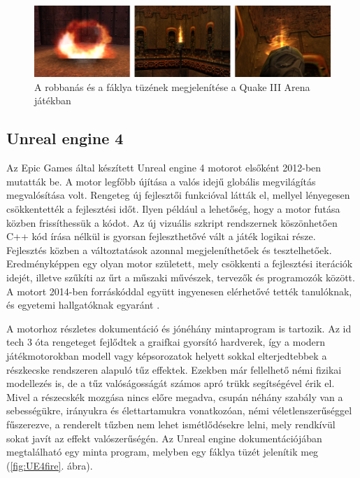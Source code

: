 
\begin{figure}[h]
\centering
\includegraphics[width=\textwidth]{kepek/quake3fire.png}
\caption{A robbanás és a fáklya tüzének megjelenítése a Quake III Arena játékban}
\label{fig:quake3fire}
\end{figure}



\subsection{Unreal engine 4}

Az Epic Games által készített Unreal engine 4 motorot elsőként 2012-ben mutatták be. A motor legfőbb újítása a valós idejű globális megvilágítás megvalósítása volt. Rengeteg új fejlesztői funkcióval látták el, mellyel lényegesen csökkentették a fejlesztési időt. Ilyen például a lehetőség, hogy a motor futása közben frissíthessük a kódot. Az új vizuális szkript rendszernek köszönhetően C++ kód írása nélkül is gyorsan fejleszthetővé vált a játék logikai része. Fejlesztés közben a változtatások azonnal megjeleníthetőek és tesztelhetőek. Eredményképpen egy olyan motor született, mely csökkenti a fejlesztési iterációk idejét, illetve szűkíti az űrt a műszaki művészek, tervezők és programozók között. A motort 2014-ben forráskóddal együtt ingyenesen elérhetővé tették tanulóknak, és egyetemi hallgatóknak egyaránt \cite{wikUE4}.

A motorhoz részletes dokumentáció és jónéhány mintaprogram is tartozik. Az id tech 3 óta rengeteget fejlődtek a graifkai gyorsító hardverek, így a modern játékmotorokban modell vagy képsorozatok helyett sokkal elterjedtebbek a részkecske rendszeren alapuló tűz effektek. Ezekben már fellelhető némi fizikai modellezés is, de a tűz valóságosságát számos apró trükk segítségével érik el. Mivel a részecskék mozgása nincs előre megadva, csupán néhány szabály van a sebességükre, irányukra és élettartamukra vonatkozóan, némi véletlenszerűséggel fűszerezve, a renderelt tűzben nem lehet ismétlődésekre lelni, mely rendkívül sokat javít az effekt valószerűségén. Az Unreal engine dokumentációjában megtalálható egy minta program, melyben egy fáklya tüzét jelenítik meg (\ref{fig:UE4fire}. ábra).

